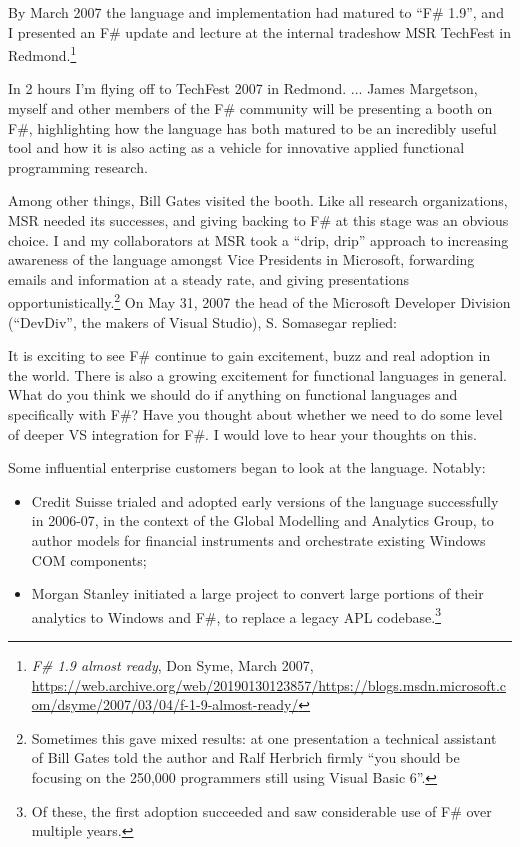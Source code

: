 \documentclass[acmsmall]{acmart}\settopmatter{}
\begin{document}
By March 2007 the language and implementation had matured to “F\# 1.9”, and I presented an F\# update and lecture at the internal tradeshow MSR TechFest in Redmond.\footnote{\textit{F\# 1.9 almost ready}, Don Syme, March 2007, \url{https://web.archive.org/web/20190130123857/https://blogs.msdn.microsoft.com/dsyme/2007/03/04/f-1-9-almost-ready/}}

\begin{verbquote}
In 2 hours I'm flying off to TechFest 2007 in Redmond. ... James Margetson, myself and other members of the F# community
will be presenting a booth on F#, highlighting how the language has both matured to be an incredibly useful tool and how it is
also acting as a vehicle for innovative applied functional programming research.
\end{verbquote}



Among other things, Bill Gates visited the booth. Like all research organizations, MSR needed its successes, and
giving backing to F\# at this stage was an obvious choice. I and my collaborators at MSR took a “drip, drip” approach
to increasing awareness of the language amongst Vice Presidents in Microsoft, forwarding emails and information at
a steady rate, and giving presentations opportunistically.\footnote{Sometimes this gave mixed results: at one presentation
a technical assistant of Bill Gates told the author and Ralf Herbrich firmly “you should be focusing on the 250,000 programmers still using Visual Basic 6”.}   On May 31,
2007 the head of the Microsoft Developer Division (“DevDiv”, the makers of Visual Studio), S. Somasegar replied:

\begin{verbquote}
It is exciting to see F# continue to gain excitement, buzz and real adoption in the world. There is also a growing excitement for functional languages in general. What do you think we should do if anything on functional languages and specifically with F#?  Have you thought about whether we need to do some level of deeper VS integration for F#.  I would love to hear your thoughts on this.
\end{verbquote}
Some influential enterprise customers began to look at the language.  Notably:

\begin{itemize}
\item Credit Suisse trialed and adopted early versions of the language successfully in 2006-07, in the context
of the Global Modelling and Analytics Group, to author models for financial instruments and orchestrate existing Windows COM components;
\item Morgan Stanley initiated a large project to convert large portions of their analytics to Windows and F\#, to
replace a legacy APL codebase.\footnote{Of these, the first adoption succeeded and saw considerable use of F\# over multiple years.}
\end{itemize}
\end{document}
